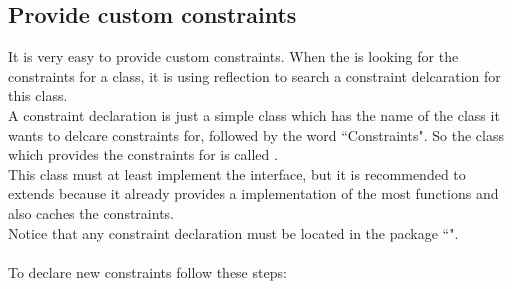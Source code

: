 \subsection{Provide custom constraints}
It is very easy to provide custom constraints. When the  is looking for the constraints for a class, it is using reflection to search a constraint delcaration for this class. \\
A constraint declaration is just a simple class which has the name of the class it wants to delcare constraints for, followed by the word ``Constraints". So the class which provides the constraints for \Species is called .\\ This class must at least implement the  interface, but it is recommended to extends  because it already provides a implementation of the most functions and also caches the constraints.\\
Notice that any constraint declaration must be located in the package ``".
\\\\
To declare new constraints follow these steps:
